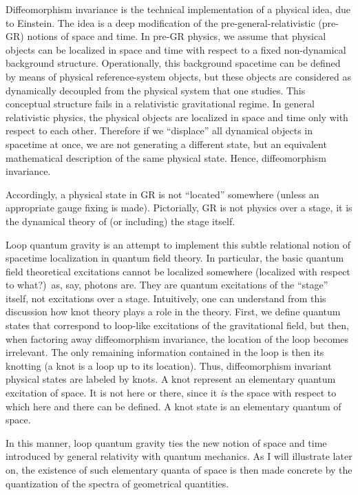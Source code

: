 \documentclass[12pt]{article}
\begin{document}
Diffeomorphism invariance is the technical implementation of a 
physical idea, due to Einstein.  The idea is a deep modification 
of the pre-general-relativistic (pre-GR) notions of space and 
time.  In pre-GR physics, we assume that physical objects can be 
localized in space and time with respect to a fixed non-dynamical 
background structure.  Operationally, this background spacetime 
can be defined by means of physical reference-system objects, but 
these objects are considered as dynamically decoupled from the 
physical system that one studies.  This conceptual structure 
fails in a relativistic gravitational regime.  In general 
relativistic physics, the physical objects are localized in space 
and time only with respect to each other.  Therefore if we 
``displace'' all dynamical objects in spacetime at once, we are 
not generating a different state, but an equivalent mathematical 
description of the same physical state.  Hence, diffeomorphism 
invariance.

Accordingly, a physical state in GR is not ``located'' somewhere 
\cite{RovelliHalf,RovelliObservables,RovelliLocalization2} 
(unless an appropriate gauge fixing is made).  Pictorially, GR is 
not physics over a stage, it is the dynamical theory of (or 
including) the stage itself.

Loop quantum gravity is an attempt to implement this subtle 
relational notion of spacetime localization in quantum field 
theory.  In particular, the basic quantum field theoretical 
excitations cannot be localized somewhere (localized with respect 
to what?)\ as, say, photons are.  They are quantum excitations of 
the ``stage'' itself, not excitations over a stage.  Intuitively, 
one can understand from this discussion how knot theory plays a 
role in the theory.  First, we define quantum states that 
correspond to loop-like excitations of the gravitational field, 
but then, when factoring away diffeomorphism invariance, the 
location of the loop becomes irrelevant.  The only remaining 
information contained in the loop is then its knotting (a knot is 
a loop up to its location).  Thus, diffeomorphism invariant 
physical states are labeled by knots.  A knot represent an 
elementary quantum excitation of space.  It is not here or there, 
since it {\em is\/} the space with respect to which here and 
there can be defined.  A knot state is an elementary quantum of 
space.

In this manner, loop quantum gravity ties the new notion of space 
and time introduced by general relativity with quantum mechanics.  
As I will illustrate later on, the existence of such elementary 
quanta of space is then made concrete by the quantization of the 
spectra of geometrical quantities.
\end{document}
